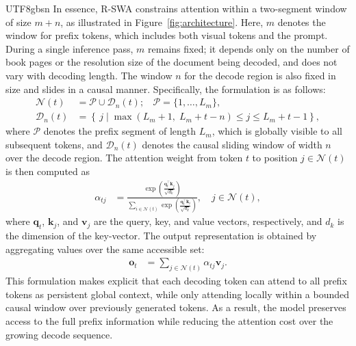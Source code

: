 \documentclass[11pt, a4paper, logo, copyright, nonumbering]{deepseek}
\begin{document}
\begin{CJK*}{UTF8}{gbsn}
In essence, R-SWA constrains attention within a two-segment window of size $m+n$, as illustrated in Figure~\ref{fig:architecture}. Here, $m$ denotes the window for prefix tokens, which includes both visual tokens and the prompt. During a single inference pass, 
$m$ remains fixed; it depends only on the number of book pages or the resolution size of the document being decoded, and does not vary with decoding length. The window $n$ for the decode region is also fixed in size and slides in a causal manner. Specifically, the formulation is as follows:
\begin{align}
\mathcal{N}(t) &= \mathcal{P}\cup \mathcal{D}_n(t); \ \ \ \ \mathcal{P} = \{1,\dots,L_m\}, \\
\mathcal{D}_n(t) &= \left\{\,j \mid \max(L_m+1,\;L_m+t-n)\le j \le L_m+t-1 \right\},
\end{align}
where $\mathcal{P}$ denotes the prefix segment of length $L_m$, which is globally visible to all subsequent tokens, and $\mathcal{D}_n(t)$ denotes the causal sliding window of width $n$ over the decode region. The attention weight from token $t$ to position $j\in\mathcal{N}(t)$ is then computed as
\begin{align}
\alpha_{tj}
&=
\frac{
\exp\left(\frac{\mathbf{q}_t^\top \mathbf{k}_j}{\sqrt{d_k}}\right)
}{
\sum\limits_{i\in\mathcal{N}(t)}
\exp\left(\frac{\mathbf{q}_t^\top \mathbf{k}_i}{\sqrt{d_k}}\right)
},
\quad j\in\mathcal{N}(t),
\end{align}
where $\mathbf{q}_t$, $\mathbf{k}_j$, and $\mathbf{v}_j$ are the query, key, and value vectors, respectively, and $d_k$ is the dimension of the key-vector. The output representation is obtained by aggregating values over the same accessible set:
\begin{align}
\mathbf{o}_t
&=
\sum_{j\in\mathcal{N}(t)} \alpha_{tj}\mathbf{v}_j .
\end{align}
This formulation makes explicit that each decoding token can attend to all prefix tokens as persistent global context, while only attending locally within a bounded causal window over previously generated tokens. As a result, the model preserves access to the full prefix information while reducing the attention cost over the growing decode sequence.


\end{CJK*}
\end{document}
